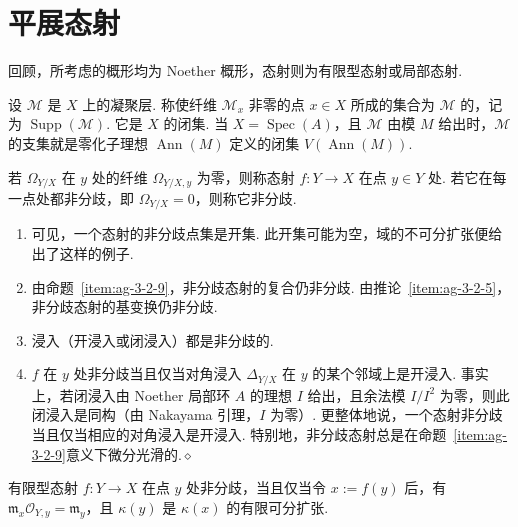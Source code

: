 \section{平展态射}\label{sec:ag-3-3}
回顾，所考虑的概形均为 Noether 概形，态射则为有限型态射或局部态射.
\begin{numpara}[凝聚层支集的回顾]\label{item:ag-3-3-1}
设 $\mathcal M$ 是 $X$ 上的凝聚层. 称使纤维 $\mathcal M_x$ 非零的点 $x\in X$ 所成的集合为 $\mathcal M$ 的，记为 $\operatorname{Supp}(\mathcal M)$. 它是 $X$ 的闭集. 当 $X=\operatorname{Spec}(A)$，且 $\mathcal M$ 由模 $M$ 给出时，$\mathcal M$ 的支集就是零化子理想 $\operatorname{Ann}(M)$ 定义的闭集 $V(\operatorname{Ann}(M))$.
\end{numpara}
\begin{definition}\label{item:ag-3-3-2}
若 $\Omega_{Y/X}$ 在 $y$ 处的纤维 $\Omega_{Y/X,y}$ 为零，则称态射 $f:Y\longrightarrow X$ 在点 $y\in Y$ 处. 若它在每一点处都非分歧，即 $\Omega_{Y/X}=0$，则称它非分歧.
\end{definition}
\begin{remark}\label{item:ag-3-3-3}
\begin{enumerate}[label=(\roman*)]
\item 可见，一个态射的非分歧点集是开集. 此开集可能为空，域的不可分扩张便给出了这样的例子.
\item 由命题~\ref{item:ag-3-2-9}，非分歧态射的复合仍非分歧. 由推论~\ref{item:ag-3-2-5}，非分歧态射的基变换仍非分歧.
\item 浸入（开浸入或闭浸入）都是非分歧的.
\item $f$ 在 $y$ 处非分歧当且仅当对角浸入 $\Delta_{Y/X}$ 在 $y$ 的某个邻域上是开浸入. 事实上，若闭浸入由 Noether 局部环 $A$ 的理想 $I$ 给出，且余法模 $I/I^2$ 为零，则此闭浸入是同构（由 Nakayama 引理，$I$ 为零）. 更整体地说，一个态射非分歧当且仅当相应的对角浸入是开浸入. 特别地，非分歧态射总是在命题~\ref{item:ag-3-2-9}意义下微分光滑的.\unskip\nobreak\hfill\ensuremath{\diamond}
\end{enumerate}
\renewcommand{\envenddiamond}{}
\end{remark}
\begin{proposition}\label{item:ag-3-3-4}
有限型态射 $f:Y\longrightarrow X$ 在点 $y$ 处非分歧，当且仅当令 $x:=f(y)$ 后，有 $\mathfrak m_x\mathcal O_{Y,y}=\mathfrak m_y$，且 $\kappa(y)$ 是 $\kappa(x)$ 的有限可分扩张.
\end{proposition}
